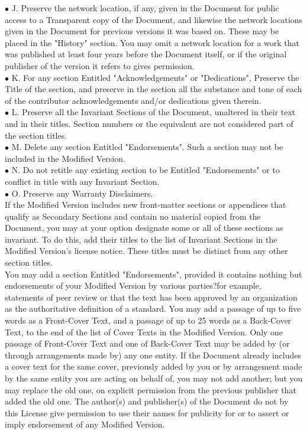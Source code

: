 $\bullet$	J. Preserve the network location, if any, given in the Document for public access to a Transparent copy of the Document, and likewise the network locations given in the Document for previous versions it was based on. These may be placed in the "History" section. You may omit a network location for a work that was published at least four years before the Document itself, or if the original publisher of the version it refers to gives permission. \\
$\bullet$	K. For any section Entitled "Acknowledgements" or "Dedications", Preserve the Title of the section, and preserve in the section all the substance and tone of each of the contributor acknowledgements and/or dedications given therein. \\
$\bullet$	L. Preserve all the Invariant Sections of the Document, unaltered in their text and in their titles. Section numbers or the equivalent are not considered part of the section titles. \\
$\bullet$	M. Delete any section Entitled "Endorsements". Such a section may not be included in the Modified Version. \\
$\bullet$	N. Do not retitle any existing section to be Entitled "Endorsements" or to conflict in title with any Invariant Section. \\
$\bullet$	O. Preserve any Warranty Disclaimers. \\
If the Modified Version includes new front-matter sections or appendices that qualify as Secondary Sections and contain no material copied from the Document, you may at your option designate some or all of these sections as invariant. To do this, add their titles to the list of Invariant Sections in the Modified Version's license notice. These titles must be distinct from any other section titles.\\
You may add a section Entitled "Endorsements", provided it contains nothing but endorsements of your Modified Version by various parties?for example, statements of peer review or that the text has been approved by an organization as the authoritative definition of a standard.
You may add a passage of up to five words as a Front-Cover Text, and a passage of up to 25 words as a Back-Cover Text, to the end of the list of Cover Texts in the Modified Version. Only one passage of Front-Cover Text and one of Back-Cover Text may be added by (or through arrangements made by) any one entity. If the Document already includes a cover text for the same cover, previously added by you or by arrangement made by the same entity you are acting on behalf of, you may not add another; but you may replace the old one, on explicit permission from the previous publisher that added the old one.
The author(s) and publisher(s) of the Document do not by this License give permission to use their names for publicity for or to assert or imply endorsement of any Modified Version.

